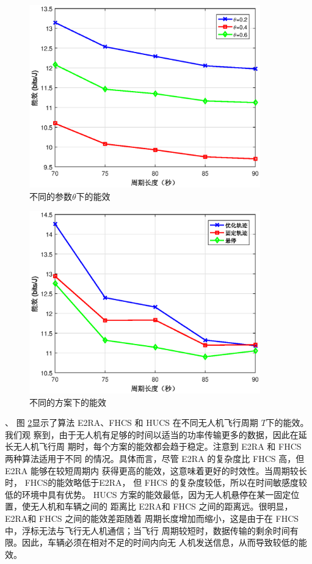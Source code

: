 \begin{figure}[H]
\centering
\includegraphics[width=10cm]{figures//chap4//不同的参数theta下的能效.eps}
\caption{不同的参数$\theta$下的能效}
\label{不同的参数theta下的能效}
\end{figure}

\begin{figure}[H]
\centering
\includegraphics[width=10cm]{figures//chap4//不同的方案下的能效.eps}
\caption{不同的方案下的能效}
\label{不同的方案下的能效}
\end{figure}
、
图 \ref{不同的方案下的能效}显示了算法 E2RA、FHCS 和 HUCS 在不同无人机飞行周期 $T $下的能效。我们观
察到，由于无人机有足够的时间以适当的功率传输更多的数据，因此在延长无人机飞行周
期时，每个方案的能效都会趋于稳定。注意到 E2RA 和 FHCS 两种算法适用于不同
的情况。具体而言，尽管 E2RA 的复杂度比 FHCS 高，但 E2RA 能够在较短周期内
获得更高的能效，这意味着更好的时效性。当周期较长时， FHCS的能效略低于E2RA，
但 FHCS 的复杂度较低，所以在时间敏感度较低的环境中具有优势。
HUCS 方案的能效最低，因为无人机悬停在某一固定位置，使无人机和车辆之间的
距离比 E2RA和 FHCS 之间的距离远。很明显，E2RA和 FHCS 之间的能效差距随着
周期长度增加而缩小，这是由于在 FHCS 中，浮标无法与飞行无人机通信；当飞行
周期较短时，数据传输的剩余时间有限。因此，车辆必须在相对不足的时间内向无
人机发送信息，从而导致较低的能效。

